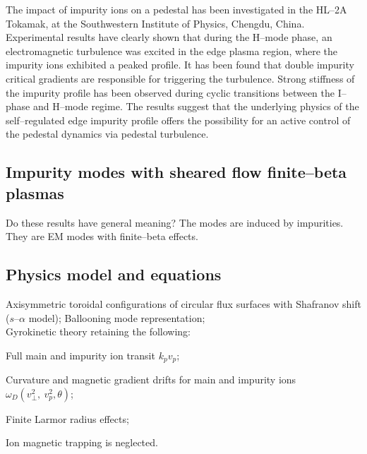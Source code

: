 \documentclass[a4paper,openany,12pt]{book}
\begin{document}
{The impact of impurity ions on a pedestal has been investigated in the HL--2A Tokamak, at the Southwestern Institute of Physics, Chengdu, China. Experimental results have clearly shown that during the H--mode phase, an electromagnetic turbulence was excited in the edge plasma region, where the impurity ions exhibited a peaked profile. It has been found that double impurity critical gradients are responsible for triggering the turbulence. Strong stiffness of the impurity profile has been observed during cyclic transitions between the I--phase and H--mode regime. The results suggest that the underlying physics of the self--regulated edge impurity profile offers the possibility for an active control of the pedestal dynamics via pedestal turbulence.

\subsection{Impurity modes with sheared flow finite--beta plasmas}

Do these results have general meaning? The modes are induced by impurities. They are EM modes with finite--beta effects.

\subsection{Physics model and equations}

Axisymmetric toroidal configurations of circular flux surfaces with Shafranov shift 
($s$--$\alpha$ model); Ballooning mode representation;\\

Gyrokinetic theory retaining the following:

Full main and impurity ion transit $k_p v_p$;

Curvature and magnetic gradient drifts for main and impurity ions $\omega_D(v_\perp^2,\ v_p^2, \theta)$;

Finite Larmor radius effects;

Ion magnetic trapping is neglected.\\

}
\end{document}
